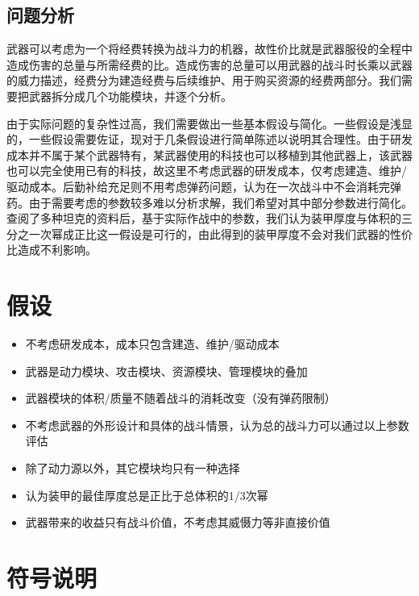 \documentclass[UTF8]{mcmthesis}
\begin{document}
\subsection{问题分析}
武器可以考虑为一个将经费转换为战斗力的机器，故性价比就是武器服役的全程中造成伤害的总量与所需经费的比。造成伤害的总量可以用武器的战斗时长乘以武器的威力描述，经费分为建造经费与后续维护、用于购买资源的经费两部分。我们需要把武器拆分成几个功能模块，并逐个分析。

由于实际问题的复杂性过高，我们需要做出一些基本假设与简化。一些假设是浅显的，一些假设需要佐证，现对于几条假设进行简单陈述以说明其合理性。由于研发成本并不属于某个武器特有，某武器使用的科技也可以移植到其他武器上，该武器也可以完全使用已有的科技，故这里不考虑武器的研发成本，仅考虑建造、维护/驱动成本。后勤补给充足则不用考虑弹药问题，认为在一次战斗中不会消耗完弹药。由于需要考虑的参数较多难以分析求解，我们希望对其中部分参数进行简化。查阅了多种坦克的资料后，基于实际作战中的参数，我们认为装甲厚度与体积的三分之一次幂成正比这一假设是可行的，由此得到的装甲厚度不会对我们武器的性价比造成不利影响。


\section{假设}

\begin{itemize}
\item 不考虑研发成本，成本只包含建造、维护/驱动成本
\item 武器是动力模块、攻击模块、资源模块、管理模块的叠加
\item 武器模块的体积/质量不随着战斗的消耗改变（没有弹药限制）
\item 不考虑武器的外形设计和具体的战斗情景，认为总的战斗力可以通过以上参数评估
\item 除了动力源以外，其它模块均只有一种选择
\item 认为装甲的最佳厚度总是正比于总体积的1/3次幂
\item 武器带来的收益只有战斗价值，不考虑其威慑力等非直接价值
\end{itemize}

\section{符号说明}
\end{document}
